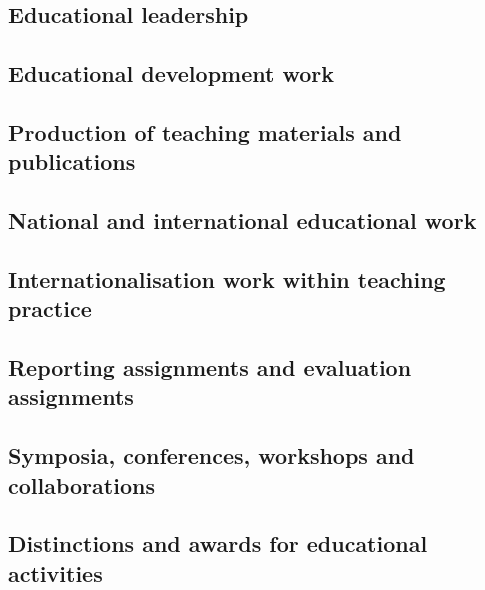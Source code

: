 \subsection{Educational leadership}\label{ssec:educational-leadership}
\subsection{Educational development work}\label{ssec:educational-development-work}
\subsection{Production of teaching materials and publications}\label{ssec:production-of-teaching-materials-and-publications}
\subsection{National and international educational work}\label{ssec:national-and-international-educational-work}
\subsection{Internationalisation work within teaching practice}\label{ssec:internationalisation-work-within-teaching-practice}
\subsection{Reporting assignments and evaluation assignments}\label{ssec:reporting-assignments-and-evaluation-assignments}
\subsection{Symposia, conferences, workshops and collaborations}\label{ssec:symposia-conferences-workshops-and-collaborations}
\subsection{Distinctions and awards for educational activities}\label{ssec:distinctions-and-awards-for-educational-activities}
